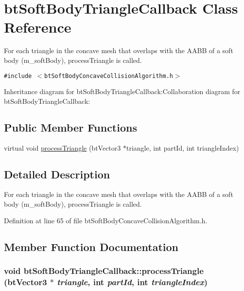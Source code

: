 \hypertarget{classbt_soft_body_triangle_callback}{
\section{btSoftBodyTriangleCallback Class Reference}
\label{classbt_soft_body_triangle_callback}
}
For each triangle in the concave mesh that overlaps with the AABB of a soft body (m\_\-softBody), processTriangle is called.  


{\tt \#include $<$btSoftBodyConcaveCollisionAlgorithm.h$>$}

Inheritance diagram for btSoftBodyTriangleCallback:Collaboration diagram for btSoftBodyTriangleCallback:\subsection*{Public Member Functions}
\begin{CompactItemize}
\item 
virtual void \hyperlink{classbt_soft_body_triangle_callback_0f8b46eba213eb55a451e182d2f6a9be}{processTriangle} (btVector3 $\ast$triangle, int partId, int triangleIndex)
\end{CompactItemize}


\subsection{Detailed Description}
For each triangle in the concave mesh that overlaps with the AABB of a soft body (m\_\-softBody), processTriangle is called. 

Definition at line 65 of file btSoftBodyConcaveCollisionAlgorithm.h.

\subsection{Member Function Documentation}
\hypertarget{classbt_soft_body_triangle_callback_0f8b46eba213eb55a451e182d2f6a9be}{
\subsubsection[processTriangle]{\setlength{\rightskip}{0pt plus 5cm}void btSoftBodyTriangleCallback::processTriangle (btVector3 $\ast$ {\em triangle}, \/  int {\em partId}, \/  int {\em triangleIndex})}}
\label{classbt_soft_body_triangle_callback_0f8b46eba213eb55a451e182d2f6a9be}




